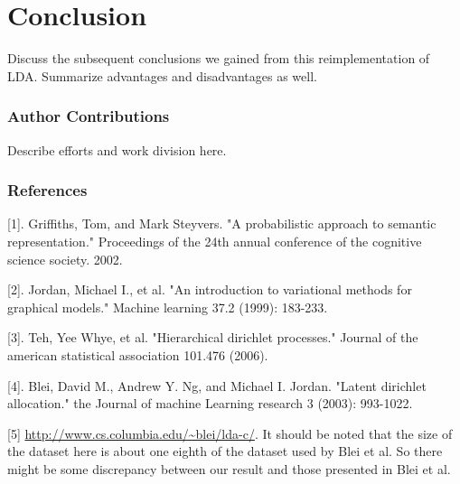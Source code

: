 \documentclass{article} %
\begin{document}
\section{Conclusion}
Discuss the subsequent conclusions we gained from this reimplementation of LDA.
Summarize advantages and disadvantages as well.

\subsubsection*{Author Contributions}
Describe efforts and work division here.
%

\subsubsection*{References}


\small{

[1]. Griffiths, Tom, and Mark Steyvers. "A probabilistic approach to semantic representation." Proceedings of the 24th annual conference of the cognitive science society. 2002.

[2]. Jordan, Michael I., et al. "An introduction to variational methods for graphical models." Machine learning 37.2 (1999): 183-233.

[3]. Teh, Yee Whye, et al. "Hierarchical dirichlet processes." Journal of the american statistical association 101.476 (2006).

[4]. Blei, David M., Andrew Y. Ng, and Michael I. Jordan. "Latent dirichlet allocation." the Journal of machine Learning research 3 (2003): 993-1022.

[5] \url{http://www.cs.columbia.edu/~blei/lda-c/}. It should be noted that the size of the dataset here is about one eighth of the dataset used by Blei et al. So there might be some discrepancy between our result and those presented in Blei et al.

%
%
}
\end{document}
